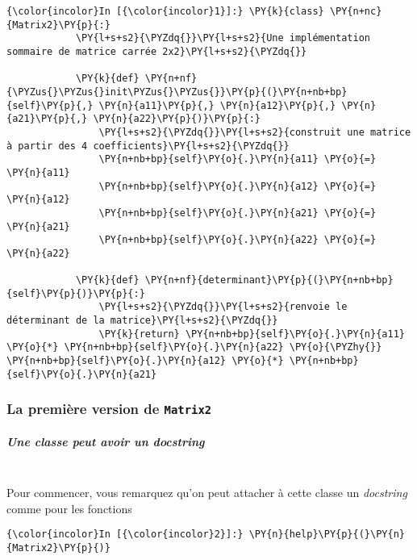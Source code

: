     \begin{Verbatim}[commandchars=\\\{\}]
{\color{incolor}In [{\color{incolor}1}]:} \PY{k}{class} \PY{n+nc}{Matrix2}\PY{p}{:}
            \PY{l+s+s2}{\PYZdq{}}\PY{l+s+s2}{Une implémentation sommaire de matrice carrée 2x2}\PY{l+s+s2}{\PYZdq{}}
        
            \PY{k}{def} \PY{n+nf}{\PYZus{}\PYZus{}init\PYZus{}\PYZus{}}\PY{p}{(}\PY{n+nb+bp}{self}\PY{p}{,} \PY{n}{a11}\PY{p}{,} \PY{n}{a12}\PY{p}{,} \PY{n}{a21}\PY{p}{,} \PY{n}{a22}\PY{p}{)}\PY{p}{:}
                \PY{l+s+s2}{\PYZdq{}}\PY{l+s+s2}{construit une matrice à partir des 4 coefficients}\PY{l+s+s2}{\PYZdq{}}
                \PY{n+nb+bp}{self}\PY{o}{.}\PY{n}{a11} \PY{o}{=} \PY{n}{a11}
                \PY{n+nb+bp}{self}\PY{o}{.}\PY{n}{a12} \PY{o}{=} \PY{n}{a12}
                \PY{n+nb+bp}{self}\PY{o}{.}\PY{n}{a21} \PY{o}{=} \PY{n}{a21}
                \PY{n+nb+bp}{self}\PY{o}{.}\PY{n}{a22} \PY{o}{=} \PY{n}{a22}
                
            \PY{k}{def} \PY{n+nf}{determinant}\PY{p}{(}\PY{n+nb+bp}{self}\PY{p}{)}\PY{p}{:}
                \PY{l+s+s2}{\PYZdq{}}\PY{l+s+s2}{renvoie le déterminant de la matrice}\PY{l+s+s2}{\PYZdq{}}
                \PY{k}{return} \PY{n+nb+bp}{self}\PY{o}{.}\PY{n}{a11} \PY{o}{*} \PY{n+nb+bp}{self}\PY{o}{.}\PY{n}{a22} \PY{o}{\PYZhy{}} \PY{n+nb+bp}{self}\PY{o}{.}\PY{n}{a12} \PY{o}{*} \PY{n+nb+bp}{self}\PY{o}{.}\PY{n}{a21}
\end{Verbatim}


    \hypertarget{la-premiuxe8re-version-de-matrix2}{%
\subsubsection{\texorpdfstring{La première version de
\texttt{Matrix2}}{La première version de Matrix2}}\label{la-premiuxe8re-version-de-matrix2}}

    \hypertarget{une-classe-peut-avoir-un-docstring}{%
\subparagraph{\texorpdfstring{Une classe peut avoir un
\emph{docstring}\\\\}{Une classe peut avoir un docstring}}\label{une-classe-peut-avoir-un-docstring}}

    Pour commencer, vous remarquez qu'on peut attacher à cette classe un
\emph{docstring} comme pour les fonctions

    \begin{Verbatim}[commandchars=\\\{\}]
{\color{incolor}In [{\color{incolor}2}]:} \PY{n}{help}\PY{p}{(}\PY{n}{Matrix2}\PY{p}{)}
\end{Verbatim}



